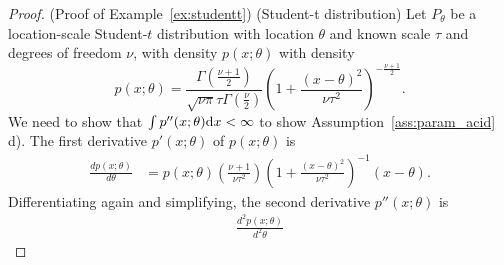 \documentclass{article}
\theoremstyle{definition}
\newcommand{\di}{{\rm d}}
\renewcommand{\&}{and}
\begin{document}
\begin{proof}(Proof of Example~\ref{ex:studentt}) 
(Student-t distribution)  Let $P_{\theta}$ be a location-scale Student-$t$ distribution with location $\theta$ and known scale $\tau$ and degrees of freedom $\nu$, with density $p(x;\theta)$  with density
\begin{equation*} %
p(x;\theta ) = \frac{\Gamma\left(\frac{\nu+1}{2}\right)}{\sqrt{\nu \pi} \tau \Gamma\left(\frac{\nu}{2}\right)} \left(1 + \frac{(x - \theta)^2}{\nu \tau^2} \right)^{-\frac{\nu+1}{2}}.
\end{equation*}
We need to show that $\int p''(x;\theta)\di x <\infty$ to show Assumption~\ref{ass:param_acid} d).
\noindent The first derivative $p'(x;\theta)$ of $p(x;\theta)$ is
\begin{align*} %
  \frac{d p(x;\theta)}{d \theta}&  %
  = p(x;\theta) \left(\frac{\nu+1}{\nu \tau^2}\right)\left(1 + \frac{(x - \theta)^2}{\nu \tau^2} \right)^{-1} (x-\theta).
\end{align*}
Differentiating again and simplifying, the second derivative $p''(x;\theta)$ is 
\begin{align*}
\frac{d^{2} p(x;\theta)}{d^{2}\theta} %

\end{align*}
\end{proof}
\end{document}
